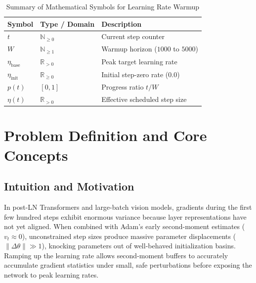 \documentclass[11pt,a4paper]{article}
\theoremstyle{definition}
\begin{document}
\begin{table}[h]
\centering
\caption{Summary of Mathematical Symbols for Learning Rate Warmup}
\begin{tabular}{lll}
\toprule
\textbf{Symbol} & \textbf{Type / Domain} & \textbf{Description} \\
\midrule
$t$ & $\mathbb{N}_{\ge 0}$ & Current step counter \\
$W$ & $\mathbb{N}_{\ge 1}$ & Warmup horizon ($1000$ to $5000$) \\
$\eta_{\text{base}}$ & $\mathbb{R}_{> 0}$ & Peak target learning rate \\
$\eta_{\text{init}}$ & $\mathbb{R}_{\ge 0}$ & Initial step-zero rate ($0.0$) \\
$p(t)$ & $[0, 1]$ & Progress ratio $t / W$ \\
$\eta(t)$ & $\mathbb{R}_{> 0}$ & Effective scheduled step size \\
\bottomrule
\end{tabular}
\end{table}

\section{Problem Definition and Core Concepts}

\subsection{Intuition and Motivation}
In post-LN Transformers and large-batch vision models, gradients during the first few hundred steps exhibit enormous variance because layer representations have not yet aligned. When combined with Adam's early second-moment estimates ($v_t \approx 0$), unconstrained step sizes produce massive parameter displacements ($\|\Delta \theta\| \gg 1$), knocking parameters out of well-behaved initialization basins. Ramping up the learning rate allows second-moment buffers to accurately accumulate gradient statistics under small, safe perturbations before exposing the network to peak learning rates.
\end{document}
